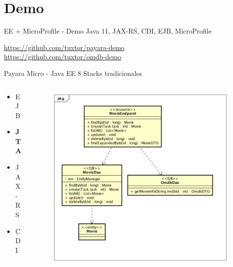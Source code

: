 \documentclass[aspectratio=169]{beamer}
\begin{document}
\section{Demo}
\begin{frame}{EE + MicroProfile  - Demo}
\huge Java 11, JAX-RS, CDI, EJB, MicroProfile

\normalsize  \url{https://github.com/tuxtor/payara-demo}\\
\normalsize  \url{https://github.com/tuxtor/omdb-demo}
\end{frame}

\begin{frame}{Payara Micro - Java EE 8}
Stacks tradicionales
\begin{columns}[T] %
\begin{column}[T]{3cm} %
	\begin{itemize}
		\item EJB
		\item \textbf{JTA}
		\item JAX-RS
		\item CDI
	\end{itemize}
\end{column}
\begin{column}[T]{7cm} %
	\begin{figure}
		\centering
		\includegraphics[width=0.9\linewidth]{Images/democlass}
	\end{figure}
\end{column}
\end{columns}
\end{frame}
\end{document}
